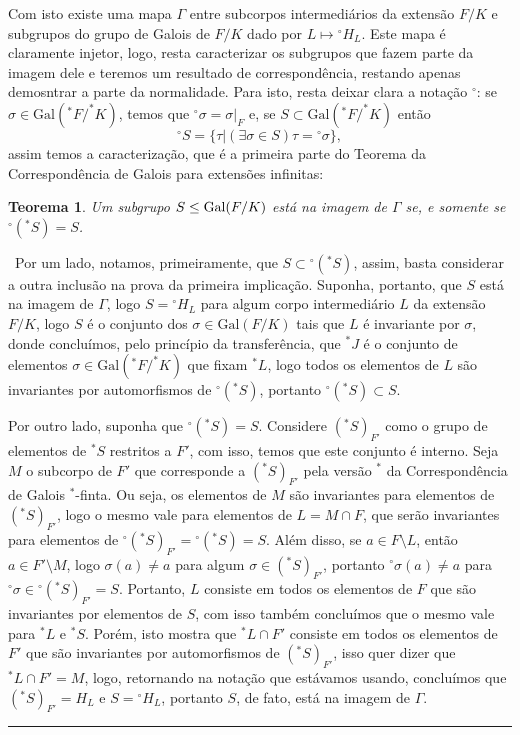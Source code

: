\documentclass[12pt,a4paper]{article}
\newtheorem{thrm}[mydef]{Teorema}
\def\dem{\par\smallbreak\noindent {\textit{ Demonstração:}} \ }
\def\eop{\hfill\rule{2.5mm}{2.5mm} \\ }
\theoremstyle{definition}
\begin{document}
Com isto existe uma mapa $\Gamma$ entre subcorpos intermediários da extensão $F/K$ e subgrupos do grupo de Galois de $F/K$ dado por $L\mapsto {^\circ H_L}$. Este mapa é claramente injetor, logo, resta caracterizar os subgrupos que fazem parte da imagem dele e teremos um resultado de correspondência, restando apenas demosntrar a parte da normalidade. Para isto, resta deixar clara a notação $^\circ$: se $\sigma\in \text{Gal}(^*F/^*K)$, temos que $^\circ \sigma=\sigma|_{F}$ e, se $S\subset \text{Gal}(^*F/^*K)$ então $$^\circ S = \{ \tau | (\exists \sigma \in S) \tau = {^\circ \sigma} \},$$ assim temos a caracterização, que é a primeira parte do Teorema da Correspondência de Galois para extensões infinitas:

\begin{thrm}

    Um subgrupo $S\leq  \text{\upshape Gal\itshape}(F/K)$ está na imagem de $\Gamma$ se, e somente se $^\circ({^*S})=S$.

\end{thrm}

\dem Por um lado, notamos, primeiramente, que $S\subset {^\circ({^*S})}$, assim, basta considerar a outra inclusão na prova da primeira implicação. Suponha, portanto, que $S$ está na imagem de $\Gamma$, logo $S={^\circ H_L}$ para algum corpo intermediário $L$ da extensão $F/K$, logo $S$ é o conjunto dos $\sigma \in  \text{Gal}(F/K)$ tais que $L$ é invariante por $\sigma$, donde concluímos, pelo princípio da transferência, que $^*J$ é o conjunto de elementos $\sigma \in  \text{Gal}(^*F/^*K)$ que fixam $^*L$, logo todos os elementos de $L$ são invariantes por automorfismos de ${^\circ({^*S})}$, portanto ${^\circ({^*S})}\subset S$.

Por outro lado, suponha que $^\circ({^*S})=S$. Considere $({^*S})_{F'}$ como o grupo de elementos de ${^*S}$ restritos a $F'$, com isso, temos que este conjunto é interno. Seja $M$ o subcorpo de $F'$ que corresponde a $({^*S})_{F'}$ pela versão $^*$ da Correspondência de Galois $^*$-finta. Ou seja, os elementos de $M$ são invariantes para elementos de $({^*S})_{F'}$, logo o mesmo vale para elementos de $L=M\cap F$, que serão invariantes para elementos de $^\circ ({^*S})_{F'}={^\circ({^*S})}=S$. Além disso, se $a\in F\setminus L$, então $a\in F'\setminus M$, logo $\sigma(a)\neq a$ para algum $\sigma \in ({^*S})_{F'}$, portanto $^\circ \sigma (a)\neq a$ para $^\circ \sigma \in {^\circ ({^*S})_{F'}}=S$. Portanto, $L$ consiste em todos os elementos de $F$ que são invariantes por elementos de $S$, com isso também concluímos que o mesmo vale para $^*L$ e $^*S$. Porém, isto mostra que $^*L\cap F'$ consiste em todos os elementos de $F'$ que são invariantes por automorfismos de $({^*S})_{F'}$, isso quer dizer que $^*L\cap F'=M$, logo, retornando na notação que estávamos usando, concluímos que $({^*S})_{F'}=H_L$ e $S={^\circ H_L}$, portanto $S$, de fato, está na imagem de $\Gamma$. \eop
\end{document}
